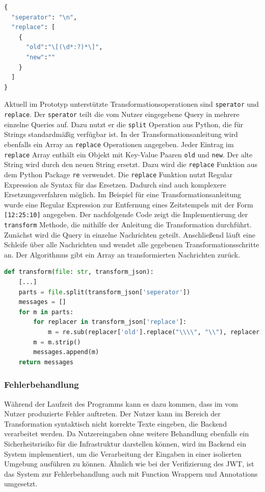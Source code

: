 \begin{lstlisting}[language=Python]
{
  "seperator": "\n",
  "replace": [
    {
      "old":"\[(\d*:?)*\]",
      "new":""
    }
  ]
}
\end{lstlisting}

Aktuell im Prototyp unterstützte Transformationsoperationen sind \texttt{sperator} und \texttt{replace}. Der \texttt{sperator} teilt die vom Nutzer eingegebene Query in mehrere einzelne Queries auf. Dazu nutzt er die \texttt{split} Operation aus Python, die für Strings standardmäßig verfügbar ist. In der Transformationsanleitung wird ebenfalls ein Array an \texttt{replace} Operationen angegeben. Jeder Eintrag im \texttt{replace} Array enthält ein Objekt mit Key-Value Paaren \texttt{old} und \texttt{new}. Der alte String wird durch den neuen String ersetzt. Dazu wird die \texttt{replace} Funktion aus dem Python Package \texttt{re} verwendet. Die \texttt{replace} Funktion nutzt Regular Expression als Syntax für das Ersetzen. Dadurch sind auch komplexere Ersetzungsverfahren möglich. Im Beispiel für eine Transformationsanleitung wurde eine Regular Expression zur Entfernung eines Zeitstempels mit der Form \texttt{[12:25:10]} angegeben. Der nachfolgende Code zeigt die Implementierung der \texttt{transform} Methode, die mithilfe der Anleitung die Transformation durchführt. Zunächst wird die Query in einzelne Nachrichten geteilt. Anschließend läuft eine Schleife über alle Nachrichten und wendet alle gegebenen Transformationsschritte an. Der Algorithmus gibt ein Array an transformierten Nachrichten zurück.

\begin{lstlisting}[language=Python]
def transform(file: str, transform_json):
    [...]
    parts = file.split(transform_json['seperator'])
    messages = []
    for m in parts:
        for replacer in transform_json['replace']:
            m = re.sub(replacer['old'].replace("\\\\", "\\"), replacer['new'], m)
        m = m.strip()
        messages.append(m)
    return messages

\end{lstlisting}

\subsubsection{Fehlerbehandlung}
Während der Laufzeit des Programms kann es dazu kommen, dass im vom Nutzer produzierte Fehler auftreten. Der Nutzer kann im Bereich der Transformation syntaktisch nicht korrekte Texte eingeben, die Backend verarbeitet werden. Da Nutzereingaben ohne weitere Behandlung ebenfalls ein Sicherheitsrisiko für die Infrastruktur darstellen können, wird im Backend ein System implementiert, um die Verarbeitung der Eingaben in einer isolierten Umgebung ausführen zu können. Ähnlich wie bei der Verifizierung des JWT, ist das System zur Fehlerbehandlung auch mit Function Wrappern und Annotations umgesetzt. 

